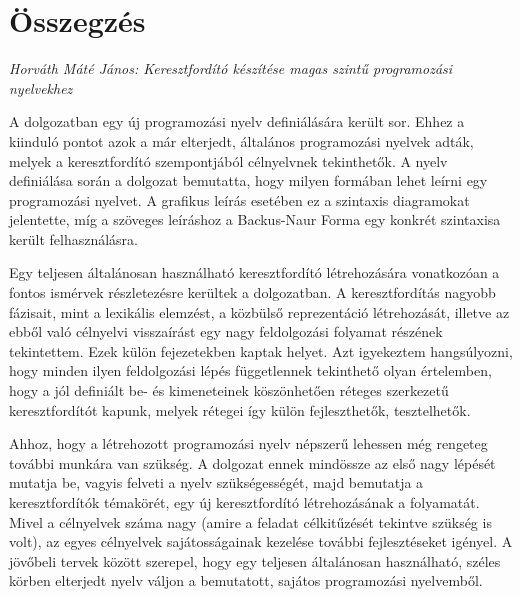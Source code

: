 \documentclass[a4paper,12pt]{article}
\begin{document}
\pagestyle{empty}

\section*{Összegzés}

\textit{Horváth Máté János: Keresztfordító készítése magas szintű programozási nyelvekhez}

\bigskip

A dolgozatban egy új programozási nyelv definiálására került sor. Ehhez a kiinduló pontot azok a már elterjedt, általános programozási nyelvek adták, melyek a keresztfordító szempontjából célnyelvnek tekinthetők. A nyelv definiálása során a dolgozat bemutatta, hogy milyen formában lehet leírni egy programozási nyelvet. A grafikus leírás esetében ez a szintaxis diagramokat jelentette, míg a szöveges leíráshoz a Backus-Naur Forma egy konkrét szintaxisa került felhasználásra.

Egy teljesen általánosan használható keresztfordító létrehozására vonatkozóan a fontos ismérvek részletezésre kerültek a dolgozatban. A keresztfordítás nagyobb fázisait, mint a lexikális elemzést, a közbülső reprezentáció létrehozását, illetve az ebből való célnyelvi visszaírást egy nagy feldolgozási folyamat részének tekintettem. Ezek külön fejezetekben kaptak helyet. Azt igyekeztem hangsúlyozni, hogy minden ilyen feldolgozási lépés függetlennek tekinthető olyan értelemben, hogy a jól definiált be- és kimeneteinek köszönhetően réteges szerkezetű keresztfordítót kapunk, melyek rétegei így külön fejleszthetők, tesztelhetők.

Ahhoz, hogy a létrehozott programozási nyelv népszerű lehessen még rengeteg további munkára van szükség. A dolgozat ennek mindössze az első nagy lépését mutatja be, vagyis felveti a nyelv szükségességét, majd bemutatja a keresztfordítók témakörét, egy új keresztfordító létrehozásának a folyamatát. Mivel a célnyelvek száma nagy (amire a feladat célkitűzését tekintve szükség is volt), az egyes célnyelvek sajátosságainak kezelése további fejlesztéseket igényel. A jövőbeli tervek között szerepel, hogy egy teljesen általánosan használható, széles körben elterjedt nyelv váljon a bemutatott, sajátos programozási nyelvemből.
\end{document}

